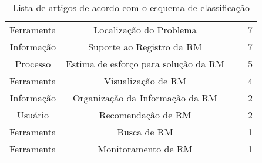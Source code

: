 \begin{table}[htbp]
{\begin{tabular}{|c|c|l|c|}
\multirow{3}{*}{Ferramenta}   & \multirow{3}{*}{Localização do Problema}      & \cite{Bangcharoensap:2012:LSC:2419061.2419428,corley2011recovering,Nguyen:2012:MAR:2393596.2393671}      & \multirow{3}{*}{7}  \\
                              &                                               & \cite{Thung:2014:BIT:2635868.2661678,Wong:2014:BBF:2705615.2706096}                                      &                     \\
                              &                                               & \cite{Romo:2015:TAT:2745802.2745833,thung2013automatic}                                                  &                     \\ \hline
\multirow{2}{*}{Informação}   & \multirow{2}{*}{Suporte ao Registro da RM}    &
\cite{zimmermann2010makes, Correa2013b,moran2015auto,Moran:2015:EAA:2786805.2807557}                          & \multirow{2}{*}{7}  \\
                              &                                               & \cite{Tu:2014:MQI:2677832.2677844,White:2015:GRR:2820282.2820291,Wu2011a}                                &                     \\ \hline
\multirow{2}{*}{Processo}     & \multirow{2}{*}{Estima de esforço para solução
    da RM}      & \cite{Bhattacharya:2011:BTP:1985441.1985472,Nagwani2010,thung2012would}                                  & \multirow{2}{*}{5}  \\
                              &                                               & \cite{Vijayakumar2014,xia2015automatic}                                                                  &                     \\ \hline
Ferramenta                    & Visualização de RM                            & \cite{dal2013closer,dal2014bug,hora2012bug,takama2013application}                                        & 4                   \\ \hline
Informação                    & Organização da Informação da RM               & \cite{mani2012ausum,otoom2016severity}                                                                   & 2                   \\ \hline
Usuário                       & Recomendação de RM                            & \cite{malheiros2012source,Wang2011bug}                                                                   & 2                   \\ \hline
Ferramenta                   & Busca de RM                                   & \cite{liu2014faceted}                                                                                    & 1                   \\ \hline
Ferramenta                    & Monitoramento de RM                           &~\cite{Aggarwal:2014:MIT:2593801.2593810}                                                                 & 1                   \\ \hline
\end{tabular}%
}
\caption{Lista de artigos de acordo com o esquema de classificação}\label{tab:taxonomia-problemas-manutencao}
\end{table}
